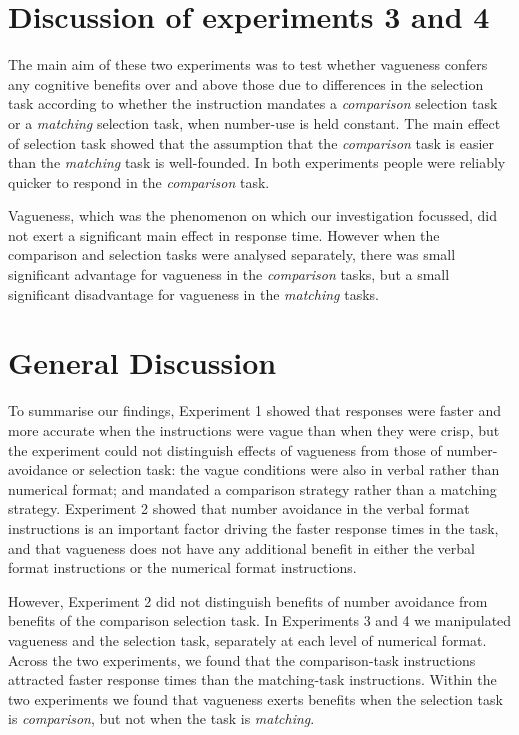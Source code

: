 \documentclass[%
man,		%
floatsintext,%
apacite%
]{apa6}
\begin{document}
\section{Discussion of experiments 3 and 4}

The main aim of these two experiments was to test whether vagueness confers any cognitive benefits over and above those due to differences in the selection task according to whether the instruction mandates a \emph{comparison} selection task or a \emph{matching} selection task, when number-use is held constant. The main effect of selection task showed that the assumption that the \emph{comparison} task is easier than the \emph{matching} task is well-founded. In both experiments people were reliably quicker to respond in the \emph{comparison} task. 

Vagueness, which was the phenomenon on which our investigation focussed, did not exert a significant main effect in response time. However when the comparison and selection tasks were analysed separately, there was small significant advantage for vagueness in the \emph{comparison} tasks, but a small significant disadvantage for vagueness in the \emph{matching} tasks. 

\section{General Discussion}

To summarise our findings, Experiment 1 showed that responses were faster and more accurate when the instructions were vague than when they were crisp, but the experiment could not distinguish effects of vagueness from those of number-avoidance or selection task: the vague conditions were also in verbal rather than numerical format; and mandated a comparison strategy rather than a matching strategy.  Experiment 2 showed that number avoidance in the verbal format instructions is an important factor driving the faster response times in the task, and that vagueness does not have any additional benefit in either the verbal format instructions or the numerical format instructions. 

However, Experiment 2 did not distinguish benefits of number avoidance from benefits of the comparison selection task. In Experiments 3 and 4 we manipulated vagueness and the selection task, separately at each level of numerical format. Across the two experiments, we found that the comparison-task instructions attracted faster response times than the matching-task instructions. Within the two experiments we found that vagueness exerts benefits when the selection task is \emph{comparison}, but not when the task is \emph{matching}.
\end{document}
